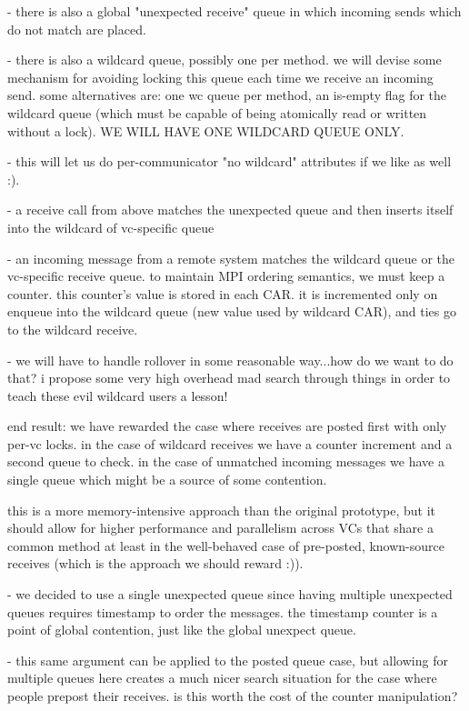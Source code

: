 \documentclass[11pt,letterpaper]{article}
\begin{document}
%
%
- there is also a global "unexpected receive" queue in which incoming sends
  which do not match are placed.

- there is also a wildcard queue, possibly one per method.  we will devise some
  mechanism for avoiding locking this queue each time we receive an incoming
  send.  some alternatives are: one wc queue per method, an is-empty flag for
  the wildcard queue (which must be capable of being atomically read or written
  without a lock).  WE WILL HAVE ONE WILDCARD QUEUE ONLY.

- this will let us do per-communicator "no wildcard" attributes if we like as
  well :).

- a receive call from above matches the unexpected queue and then inserts
  itself into the wildcard of vc-specific queue

- an incoming message from a remote system matches the wildcard queue or the
  vc-specific receive queue.  to maintain MPI ordering semantics, we must keep
  a counter.  this counter's value is stored in each CAR.  it is incremented
  only on enqueue into the wildcard queue (new value used by wildcard CAR), and
  ties go to the wildcard receive.  

- we will have to handle rollover in some reasonable way...how do we want to do
  that? i propose some very high overhead mad search through things in order
  to teach these evil wildcard users a lesson!

end result: we have rewarded the case where receives are posted first with only
per-vc locks.  in the case of wildcard receives we have a counter increment and
a second queue to check.  in the case of unmatched incoming messages we have a
single queue which might be a source of some contention.

this is a more memory-intensive approach than the original prototype, but it
should allow for higher performance and parallelism across VCs that share a
common method at least in the well-behaved case of pre-posted, known-source
receives (which is the approach we should reward :)).

- we decided to use a single unexpected queue since having multiple unexpected
  queues requires timestamp to order the messages.  the timestamp counter is a
  point of global contention, just like the global unexpect queue.

- this same argument can be applied to the posted queue case, but allowing for
  multiple queues here creates a much nicer search situation for the case where
  people prepost their receives.  is this worth the cost of the counter
  manipulation?
\end{document}
